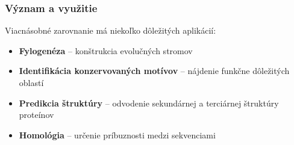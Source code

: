 \subsubsection{Význam a využitie}
Viacnásobné zarovnanie má niekoľko dôležitých aplikácií:

\begin{itemize}
    \item \textbf{Fylogenéza} -- konštrukcia evolučných stromov
    \item \textbf{Identifikácia konzervovaných motívov} -- nájdenie funkčne dôležitých oblastí
    \item \textbf{Predikcia štruktúry} -- odvodenie sekundárnej a terciárnej štruktúry proteínov
    \item \textbf{Homológia} -- určenie príbuznosti medzi sekvenciami
\end{itemize}
